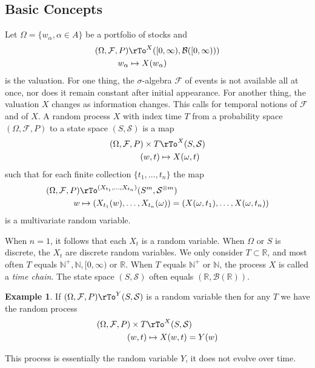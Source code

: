 \documentclass[12pt]{amsart}
\theoremstyle{definition}
\newtheorem{example}[theorem]{Example}
\begin{document}
\subsection{Basic Concepts} Let $\Omega = \{w_{\alpha}, \alpha \in A\}$ be a portfolio of stocks and
\begin{align*}
(\Omega, \mathcal{F}, P) & \rTo^X ([0, \infty), \mathcal{B}([0, \infty))) \\
w_{\alpha} & \mapsto X(w_{\alpha})
\end{align*}
is the valuation. For one thing, the $\sigma$-algebra $\mathcal{F}$ of events is not available all at once, nor does it remain constant after initial appearance. For another thing, the valuation $X$ changes as information changes. This calls for temporal notions of $\mathcal{F}$ and of $X$.
\dfn A random process $X$ with index time $T$ from a probability space $(\Omega, \mathcal{F}, P)$ to a state space $(S, \mathcal{S})$ is a map
\begin{align*}
(\Omega, \mathcal{F}, P) \times T & \rTo^X (S, \mathcal{S}) \\
(w, t) & \mapsto X(\omega, t)
\end{align*}
such that for each finite collection $\{t_1, \dots , t_n\}$ the map
\begin{align*}
(\Omega, \mathcal{F}, P) & \rTo^{(X_{t_1}, \dots , X_{t_n})} (S^m, \mathcal{S}^{\otimes m}) \\
w & \mapsto (X_{t_1}(w), \dots , X_{t_n}(\omega)) = (X(\omega, t_1), \dots , X(\omega, t_n))
\end{align*}
is a multivariate random variable.

When $n = 1$, it follows that each $X_t$ is a random variable. When $\Omega$ or $S$ is discrete, the $X_t$ are discrete random variables. We only consider $T \subset \mathbb{R}$, and most often $T$ equals $\mathbb{N}^+, \mathbb{N}, [0, \infty)$ or $\mathbb{R}$. When $T$ equals $\mathbb{N}^+$ or $\mathbb{N}$, the process $X$ is called a \textit{time chain}. The state space $(S, \mathcal{S})$ often equals $(\mathbb{R}, \mathcal{B}(\mathbb{R}))$.

\begin{example} If $(\Omega, \mathcal{F}, P) \rTo^Y (S, \mathcal{S})$ is a random variable then for any $T$ we have the random process
\begin{align*}
(\Omega, \mathcal{F}, P) \times T & \rTo^X (S, \mathcal{S}) \\
(w, t) & \mapsto X(w, t) = Y(w)
\end{align*}

This process is essentially the random variable $Y$, it does not evolve over time.
\end{example}
\end{document}
